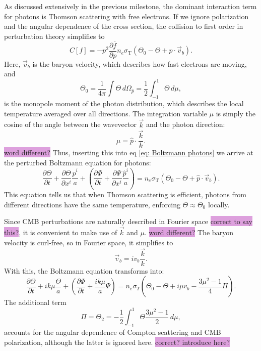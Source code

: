 \documentclass{aa}
\numberwithin{equation}{section}
\numberwithin{table}{section}
\numberwithin{figure}{section}
\begin{document}
As discussed extensively in the previous milestone, the dominant interaction term for photons is Thomson scattering with free electrons. If we ignore polarization and the angular dependence of the cross section, the collision to first order in perturbation theory simplifies to
\begin{equation}
  C[f] = -p^2\frac{\partial\overline{f}}{\partial p}n_e\sigma_\text{T}\left(\Theta_0 - \Theta + \hat{p}\cdot\vec{v}_b \right). \label{eq: collision photons}
\end{equation}
Here, $\vec{v}_b$ is the baryon velocity, which describes how fast electrons are moving, and
\begin{equation}
  \Theta_0 = \frac{1}{4\pi}\int\Theta\,d\Omega_{\hat{p}} = \frac{1}{2}\int_{-1}^{1}\Theta\,d\mu, 
\end{equation}
is the monopole moment of the photon distribution, which describes the local temperature averaged over all directions. The integration variable $\mu$ is simply the cosine of the angle between the wavevector $\vec{k}$ and the photon direction:
\begin{equation}
  \mu = \hat{p}\cdot\frac{\vec{k}}{k}.
\end{equation}
\colorbox{Plum}{word different?} Thus, inserting this into eq \eqref{eq: Boltzmann photons} we arrive at the perturbed Boltzmann equation for photons:
\begin{equation}
  \frac{\partial{\Theta}}{\partial t} + \frac{\partial{\Theta}}{\partial x^{i}}\frac{\hat{p}^{i}}{a} + \left(\frac{\partial{\Phi}}{\partial t} + \frac{\partial{\Psi}}{\partial x^{i}}\frac{\hat{p}^{i}}{a} \right) = n_e\sigma_\text{T}\left(\Theta_0 - \Theta + \hat{p}\cdot\vec{v}_b \right).
\end{equation}
This equation tells us that when Thomson scattering is efficient, photons from different directions have the same temperature, enforcing $\Theta\approx\Theta_0$ locally.

Since CMB perturbations are naturally described in Fourier space \colorbox{Plum}{correct to say this?}, it is convenient to make use of $\vec{k}$ and $\mu$. \colorbox{Plum}{word different?} The baryon velocity is curl-free, so in Fourier space, it simplifies to 
\begin{equation} 
  \vec{v}_b = iv_b \frac{\vec{k}}{k}. 
\end{equation} 
With this, the Boltzmann equation transforms into: 
\begin{equation} 
  \frac{\partial \Theta}{\partial t} + ik\mu \frac{\Theta}{a} + \left(\frac{\partial\Phi}{\partial t} + \frac{ik\mu}{a} \Psi \right) = n_e\sigma_T \left(\Theta_0 - \Theta + i\mu v_b - \frac{3\mu^2 - 1}{4} \Pi \right). \label{eq: Boltzmann photons Fourier}
\end{equation} 
The additional term 
\begin{equation}
  \Pi = \Theta_2 = -\frac{1}{2}\int_{-1}^{1}\Theta \frac{3\mu^2-1}{2}\,d\mu,
\end{equation}
accounts for the angular dependence of Compton scattering and CMB polarization, although the latter is ignored here. \colorbox{Plum}{correct? introduce here?} 
\end{document}
